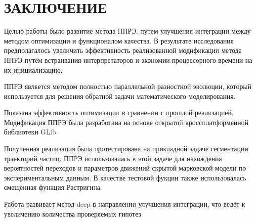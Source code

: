 \chapter*{ЗАКЛЮЧЕНИЕ}

Целью работы было развитие метода ППРЭ,
путём улучшения интеграции
между методом оптимизации
и функционалом качества.
В результате исследования
предполагалось увеличить
эффективность реализованной
модификации метода ППРЭ
путём встраивания интерпретаторов
и экономии процессорного времени
на их инициализацию.

ППРЭ является методом
полностью параллельной разностной эволюции,
который используется для решения
обратной задачи математического моделирования.

Показана эффективность
оптимизации в сравнении с
прошлой реализацией.
Модификация ППРЭ
была разработана на основе
открытой кроссплатформенной
библиотеки GLib.

Полученная реализация
была протестирована на
прикладной задаче
сегментации траекторий частиц.
ППРЭ использовалась в этой задаче
для нахождения вероятностей переходов и
параметров движений
скрытой марковской модели по
экспериментальным данным.
В качестве тестовой фукции
также использовалась
смещённая функция Растригина.

Работа развивает метод deep
в направлении улучшения интеграции,
что ведёт к увеличению количества
проверяемых гипотез.

